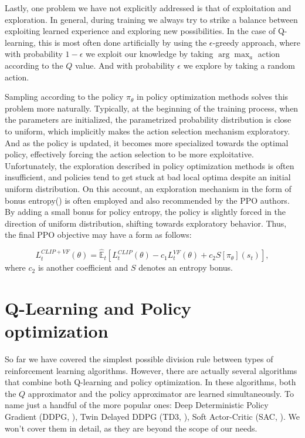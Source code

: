 \pagebreak
Lastly, one problem we have not explicitly addressed is that of exploitation and exploration.
In general, during training we always try to strike a balance between exploiting learned experience and exploring new possibilities.
In the case of Q-learning, this is most often done artificially by using the $\epsilon$-greedy approach, where with probability $1-\epsilon$ we exploit our knowledge by taking $\arg \max_a$ action according to the $Q$ value.
And with probability $\epsilon$ we explore by taking a random action.

Sampling according to the policy $\pi_\theta$ in policy optimization methods solves this problem more naturally.
Typically, at the beginning of the training process, when the parameters are initialized, the parametrized probability distribution is close to uniform, which implicitly makes the action selection mechanism exploratory.
And as the policy is updated, it becomes more specialized towards the optimal policy, effectively forcing the action selection to be more exploitative.
Unfortunately, the exploration described in policy optimization methods is often insufficient, and policies tend to get stuck at bad local optima despite an initial uniform distribution.
On this account, an exploration mechanism in the form of bonus entropy(\cite{EntropyRegularization}) is often employed and also recommended by the PPO authors.
By adding a small bonus for policy entropy, the policy is slightly forced in the direction of uniform distribution, shifting towards exploratory behavior.
Thus, the final PPO objective may have a form as follows:

\[
  L_t^{CLIP+VF}(\theta) =   \hat{\mathbb{E}}_t \left[L_t^{CLIP}(\theta) - c_1 L_t^{VF}(\theta)  + c_2S[\pi_\theta](s_t)\right],
\]
where $c_2$ is another coefficient and $S$ denotes an entropy bonus.


\section{Q-Learning and Policy optimization}\label{QPlusPolicy}
So far we have covered the simplest possible division rule between types of reinforcement learning algorithms.
However, there are actually several algorithms that combine both Q-learning and policy optimization.
In these algorithms, both the $Q$ approximator and the policy approximator are learned simultaneously.
To name just a handful of the more popular ones: Deep Deterministic Policy Gradient (DDPG, \cite{DDPG}), Twin Delayed DDPG (TD3, \cite{TD3}), Soft Actor-Critic (SAC, \cite{SAC}).
We won't cover them in detail, as they are beyond the scope of our needs.





